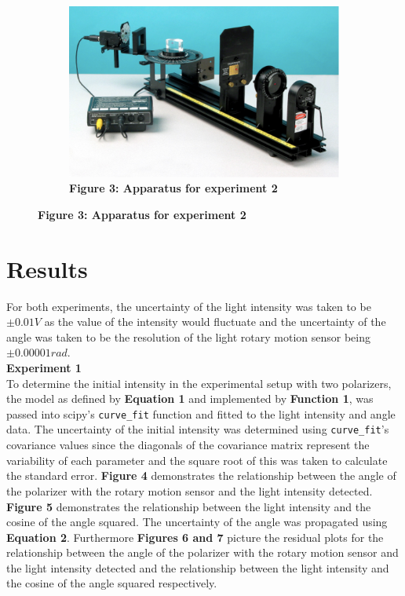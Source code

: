\documentclass[
	letterpaper, %
	10pt, %
]{CSUniSchoolLabReport}
\begin{document}
\begin{figure}[H]
	\centering
	\begin{subfigure}{0.45\textwidth}
		\includegraphics[width=\textwidth]{../figures/experimentTwoApparatus.png}
		\caption{\textbf{Figure 3: Apparatus for experiment 2}}
	\end{subfigure}
\end{figure}
\section{Results}
For both experiments, the uncertainty of the light intensity was taken to be $\pm 0.01 V$ as the value of the intensity would fluctuate
and the uncertainty of the angle was taken to be the resolution of the light rotary motion sensor being
$\pm 0.00001 rad$. \\

\textbf{Experiment 1}\\

To determine the initial intensity in the experimental setup with two polarizers, the model as defined
by \textbf{Equation 1} and implemented by \textbf{Function 1}, was passed into scipy's \lstinline{curve_fit} function and
fitted to the light intensity and angle data. The uncertainty of the initial intensity was determined
using \lstinline{curve_fit}'s covariance values since the diagonals of the covariance matrix represent
the variability of each parameter and the square root of this was taken to calculate the standard error.
\textbf{Figure 4} demonstrates the relationship between the angle of the polarizer with the rotary motion sensor
and the light intensity detected.\\
\textbf{Figure 5} demonstrates the relationship between the light intensity and the cosine of the angle squared.
The uncertainty of the angle was propagated using \textbf{Equation 2}. Furthermore \textbf{Figures 6 and 7} picture the
residual plots for the relationship between the angle of the polarizer with the rotary motion sensor
and the light intensity detected and the relationship between the light intensity and the cosine of
the angle squared respectively.\\
\end{document}
